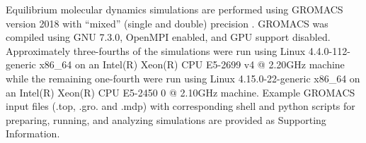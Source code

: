 \documentclass[preprint,review,12pt]{elsarticle}
\begin{document}
	
%	
	
	
	
	Equilibrium molecular dynamics simulations are performed using GROMACS version 2018 with ``mixed'' (single and double) precision \cite{GROMACS_2018}. GROMACS was compiled using GNU 7.3.0, OpenMPI enabled, and GPU support disabled. Approximately three-fourths of the simulations were run using Linux 4.4.0-112-generic x86\_64 on an Intel(R) Xeon(R) CPU E5-2699 v4 @ 2.20GHz machine while the remaining one-fourth were run using Linux 4.15.0-22-generic x86\_64 on an Intel(R) Xeon(R) CPU E5-2450 0 @ 2.10GHz machine. Example GROMACS input files (.top, .gro. and .mdp) with corresponding shell and python scripts for preparing, running, and analyzing simulations are provided as Supporting Information. 
	
\end{document}
